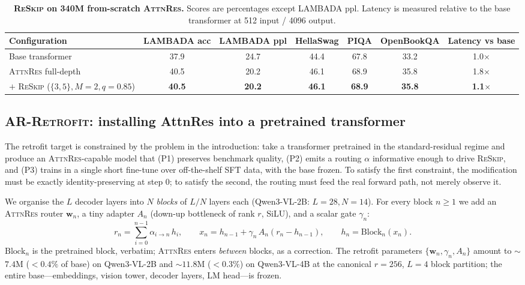 \documentclass{article}
\newcommand{\attnres}{\textsc{AttnRes}}
\newcommand{\reskip}{\textsc{ReSkip}}
\newcommand{\retrofit}{\textsc{AR-Retrofit}}
\begin{document}
\begin{table}[t]
\caption{\textbf{\reskip{} on 340M from-scratch \attnres{}.} Scores are percentages except LAMBADA ppl. Latency is measured relative to the base transformer at 512 input / 4096 output.}
\label{tab:reskip_benchmark}
\centering\small
\setlength{\tabcolsep}{3.5pt}
\begin{tabular}{lcccccc}
\toprule
Configuration & LAMBADA acc & LAMBADA ppl & HellaSwag & PIQA & OpenBookQA & Latency vs base \\
\midrule
Base transformer                            & 37.9 & 24.7 & 44.4 & 67.8 & 33.2 & 1.0$\times$ \\
\midrule
\attnres{} full-depth                       & 40.5 & 20.2 & 46.1 & 68.9 & 35.8 & 1.8$\times$ \\
$+$ \reskip{} ($\{3,5\}, M{=}2, q{=}0.85$)  & \textbf{40.5} & \textbf{20.2} & \textbf{46.1} & \textbf{68.9} & \textbf{35.8} & \textbf{1.1$\times$} \\
\bottomrule
\end{tabular}
\end{table}

\subsection{\retrofit{}: installing AttnRes into a pretrained transformer}
\label{sec:retrofit}

The retrofit target is constrained by the problem in the introduction: take a transformer pretrained in the standard-residual regime and produce an \attnres{}-capable model that (P1) preserves benchmark quality, (P2) emits a routing $\alpha$ informative enough to drive \reskip{}, and (P3) trains in a single short fine-tune over off-the-shelf SFT data, with the base frozen. To satisfy the first constraint, the modification must be exactly identity-preserving at step $0$; to satisfy the second, the routing must feed the real forward path, not merely observe it.

We organise the $L$ decoder layers into $N$ \emph{blocks} of $L/N$ layers each (Qwen3-VL-2B: $L{=}28, N{=}14$). For every block $n\ge 1$ we add an \attnres{} router $\mathbf{w}_n$, a tiny adapter $A_n$ (down-up bottleneck of rank $r$, SiLU), and a scalar gate $\gamma_n$:
\begin{equation}
  r_n = \sum_{i=0}^{n-1} \alpha_{i \to n}\,h_i, \qquad
  x_n = h_{n-1} + \gamma_n\,A_n(r_n - h_{n-1}), \qquad
  h_n = \mathrm{Block}_n(x_n).
  \label{eq:gamma_gate}
\end{equation}
$\mathrm{Block}_n$ is the pretrained block, verbatim; \attnres{} enters \emph{between} blocks, as a correction. The retrofit parameters $\{\mathbf{w}_n, \gamma_n, A_n\}$ amount to $\sim$$7.4$M ($<0.4\%$ of base) on Qwen3-VL-2B and $\sim$$11.8$M ($<0.3\%$) on Qwen3-VL-4B at the canonical $r{=}256$, $L{=}4$ block partition; the entire base---embeddings, vision tower, decoder layers, LM head---is frozen.
\end{document}
